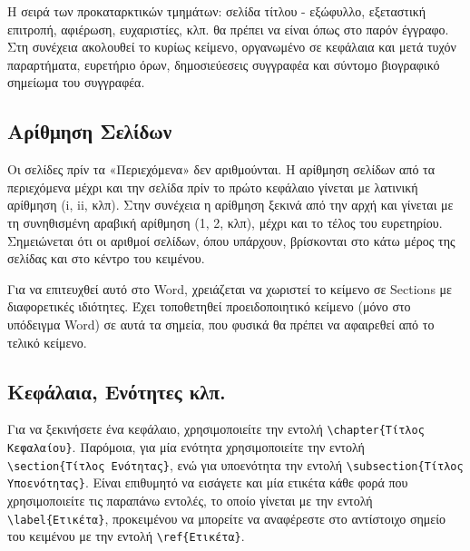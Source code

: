  Η σειρά των προκαταρκτικών τμημάτων: σελίδα τίτλου - εξώφυλλο,
εξεταστική επιτροπή, αφιέρωση, ευχαριστίες, %
κλπ. θα πρέπει να είναι όπως στο παρόν έγγραφο.
 Στη συνέχεια ακολουθεί το κυρίως κείμενο, οργανωμένο σε κεφάλαια και μετά τυχόν παραρτήματα,
ευρετήριο όρων, δημοσιεύεσεις συγγραφέα και σύντομο βιογραφικό σημείωμα του συγγραφέα.

\subsection{Αρίθμηση Σελίδων}
\label{subsec:pageNumbering}

 Οι σελίδες πρίν τα «Περιεχόμενα» δεν αριθμούνται.
 Η αρίθμηση σελίδων από τα περιεχόμενα μέχρι και την σελίδα πρίν το πρώτο κεφάλαιο γίνεται με λατινική αρίθμηση (i, ii, κλπ).
 Στην συνέχεια η αρίθμηση ξεκινά από την αρχή και γίνεται με τη συνηθισμένη αραβική αρίθμηση (1, 2, κλπ), μέχρι και το τέλος του ευρετηρίου.
 Σημειώνεται ότι οι αριθμοί σελίδων, όπου υπάρχουν, βρίσκονται στο κάτω μέρος της σελίδας και στο κέντρο του κειμένου.

 Για να επιτευχθεί αυτό στο Word, χρειάζεται να χωριστεί το κείμενο σε Sections με διαφορετικές ιδιότητες.
 Έχει τοποθετηθεί προειδοποιητικό κείμενο (μόνο στο υπόδειγμα Word) σε αυτά τα σημεία, που φυσικά θα πρέπει να αφαιρεθεί από το τελικό κείμενο.


\subsection{Κεφάλαια, Ενότητες κλπ.}
\label{subsec:Chapters}

Για να ξεκινήσετε ένα κεφάλαιο, χρησιμοποιείτε την εντολή 
\verb|\chapter{Τίτλος Κεφαλαίου}|. Παρόμοια, για μία ενότητα 
χρησιμοποιείτε την εντολή \verb|\section{Τίτλος Ενότητας}|, ενώ για υποενότητα 
την εντολή \verb|\subsection{Τίτλος Υποενότητας}|.
Είναι επιθυμητό να εισάγετε και μία ετικέτα κάθε φορά που χρησιμοποιείτε 
τις παραπάνω εντολές, το οποίο γίνεται με την εντολή \verb|\label{Ετικέτα}|, 
προκειμένου να μπορείτε να αναφέρεστε στο αντίστοιχο σημείο του κειμένου 
με την εντολή \verb|\ref{Ετικέτα}|.

